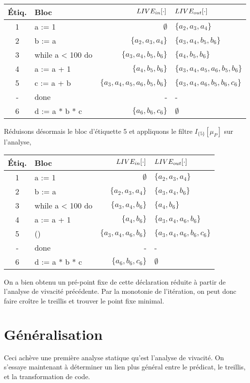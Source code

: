 \documentclass[a4paper, 12pt]{article}
\begin{document}
\begin{center}
	\begin{tabular}{||c|l|r|l||}
	\hline
	Étiq. & Bloc & $LIVE_{in}[\cdot]$ & $LIVE_{out}[\cdot]$ \\
	\hline
	1 & a := 1 & $\emptyset$ & $\{a_2, a_3, a_4\}$\\
	2 & b := a & $\{a_2, a_3, a_4\}$ & $\{a_3, a_4, b_5, b_6\}$\\
	3 & while a < 100 do & $\{a_3, a_4, b_5, b_6\}$ & $\{a_4, b_5, b_6\}$\\
	4 & a := a + 1 & $\{a_4, b_5, b_6\}$ & $\{a_3, a_4, a_5, a_6, b_5, b_6\}$\\
	5 & c := a + b & $\{a_3, a_4, a_5, a_6, b_5, b_6\}$ & $\{a_3, a_4, a_6, b_5, b_6, c_6\}$\\
	- & done & - & -\\
	6 & d := a * b * c & $\{a_6, b_6, c_6\}$ & $\emptyset$\\
	\hline
	\end{tabular}
\end{center}
Réduisons désormais le bloc d'étiquette 5 et appliquons le filtre $I_{\{5\}}[\mu_P]$ sur l'analyse,
\begin{center}
	\begin{tabular}{||c|l|r|l||}
	\hline
	Étiq. & Bloc & $LIVE_{in}[\cdot]$ & $LIVE_{out}[\cdot]$ \\
	\hline
	1 & a := 1 & $\emptyset$ & $\{a_2, a_3, a_4\}$\\
	2 & b := a & $\{a_2, a_3, a_4\}$ & $\{a_3, a_4, b_6\}$\\
	3 & while a < 100 do & $\{a_3, a_4, b_6\}$ & $\{a_4, b_6\}$\\
	4 & a := a + 1 & $\{a_4, b_6\}$ & $\{a_3, a_4, a_6, b_6\}$\\
	5 & () & $\{a_3, a_4, a_6, b_6\}$ & $\{a_3, a_4, a_6, b_6, c_6\}$\\
	- & done & - & -\\
	6 & d := a * b * c & $\{a_6, b_6, c_6\}$ & $\emptyset$\\
	\hline
	\end{tabular}
\end{center}
On a bien obtenu un pré-point fixe de cette déclaration réduite à partir de l'analyse de vivacité précédente.
Par la monotonie de l'itération, on peut donc faire croître le treillis et trouver le point fixe minimal. 
\section{Généralisation}
Ceci achève une première analyse statique qu'est l'analyse de vivacité. On s'essaye maintenant à déterminer
un lien plus général entre le prédicat, le treillis, et la transformation de code.
\end{document}
